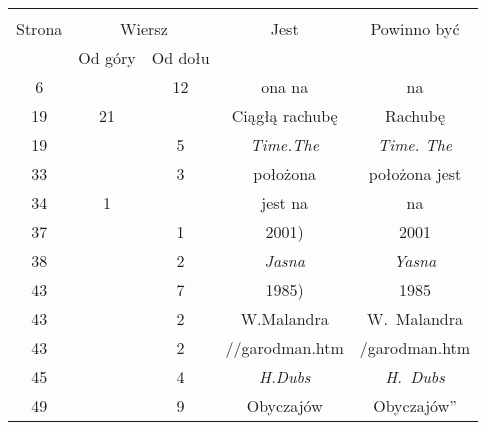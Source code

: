\documentclass[a4paper,11pt]{article}
\begin{document}














\begin{center}
  \begin{tabular}{|c|c|c|c|c|}
    \hline
    & \multicolumn{2}{c|}{} & & \\
    Strona & \multicolumn{2}{c|}{Wiersz} & Jest
                              & Powinno być \\ \cline{2-3}
    & Od góry & Od dołu & & \\
    \hline
    6   & & 12 & ona na & na \\
    19  & 21 & & Ciągłą rachubę & Rachubę \\
    19  & &  5 & \emph{Time.The} & \emph{Time. The} \\
    33  & &  3 & położona & położona jest \\
    34  &  1 & & jest na & na \\
    37  & &  1 & 2001) & 2001 \\
    38  & &  2 & \emph{Jasna} & \emph{Yasna} \\
    43  & &  7 & 1985) & 1985 \\
    43  & &  2 & W.Malandra & W.~Malandra \\
    43  & &  2 & //garodman.htm & /garodman.htm \\
    45  & &  4 & \emph{H.Dubs} & \emph{H.~Dubs} \\
    49  & &  9 & Obyczajów & Obyczajów'' \\
    \hline
  \end{tabular}
\end{center}
\end{document}
